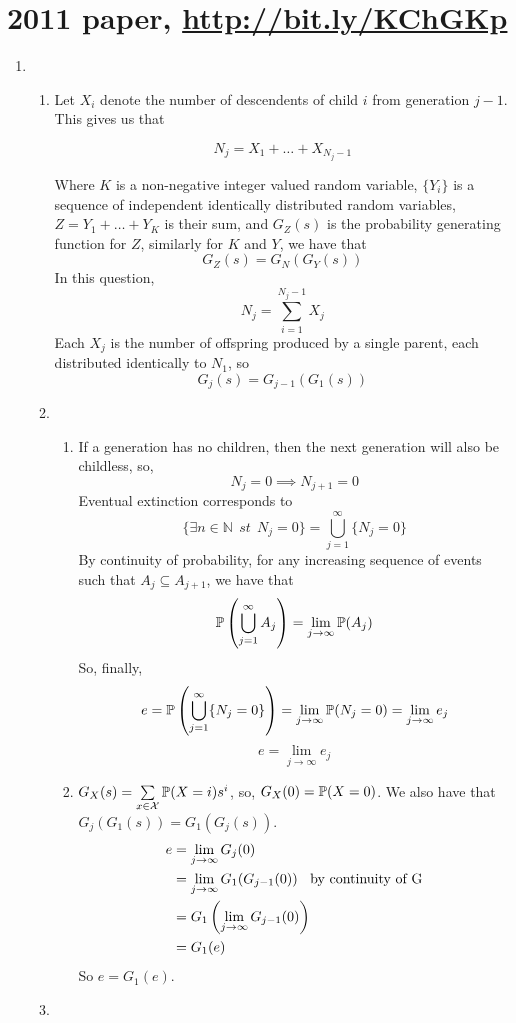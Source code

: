 \documentclass{article}
\begin{document}
\section*{2011 paper, \url{http://bit.ly/KChGKp}}
\begin{enumerate}
\item
\begin{enumerate}
\item
Let $X_i$ denote the number of descendents of child $i$ from generation $j-1$. This gives us that

$$
N_j = X_1 + \dots + X_{N_j-1}
$$

Where $K$ is a non-negative integer valued random variable, $\{Y_i\}$ is a sequence of independent identically distributed random variables, $Z=Y_1+\dots+Y_K$ is their sum, and $G_Z(s)$ is the probability generating function for $Z$, similarly for $K$ and $Y$, we have that
$$
G_Z(s) = G_N(G_Y(s))
$$
In this question, 
$$
N_j=\sum^{N_j-1}_{i=1}X_j
$$
Each $X_j$ is the number of offspring produced by a single parent, each distributed identically to $N_1$, so
$$
G_j(s) = G_{j-1}(G_1(s))
$$
\item
\begin{enumerate}
\item 
If a generation has no children, then the next generation will also be childless, so,
$$
N_j=0 \implies N_{j+1}=0
$$
Eventual extinction corresponds to 
$$
\{\exists n \in \mathbb{N} \;\, st \;\, N_j=0\} = \bigcup^\infty_{j=1}\{N_j=0\}
$$
By continuity of probability, for any increasing sequence of events such that $A_j \subseteq A_{j+1}$, we have that
$$
\mathbb{P}\left(\bigcup^\infty_{j=1}A_j\right) = \lim_{j\rightarrow\infty} \mathbb{P}(A_j)
$$
So, finally,
$$
e=\mathbb{P}\left(\bigcup^\infty_{j=1}\{N_j=0\}\right) = \lim_{j\rightarrow\infty} \mathbb{P}(N_j=0) = \lim_{j\rightarrow\infty}e_j
$$
$$
e=\lim_{j\rightarrow\infty}e_j
$$
\item
$G_X(s) = \sum\limits_{x \in \mathcal{X}}\mathbb{P}(X=i)s^i$, so, $G_X(0) = \mathbb{P}(X=0)$. We also have that $G_j(G_1(s)) = G_1(G_j(s))$.
\begin{align*}
e &= \lim_{j\rightarrow\infty}G_j(0)\\
&= \lim_{j\rightarrow\infty}G_1(G_{j-1}(0))\mbox{\;\; by continuity of G}\\
&= G_1\left(\lim_{j\rightarrow\infty}G_{j-1}(0)\right)\\
&= G_1(e)
\end{align*}
So $e = G_1(e)$.
\end{enumerate}
\item
\begin{enumerate}

\end{enumerate}
\end{enumerate}
\end{enumerate}
\end{document}
